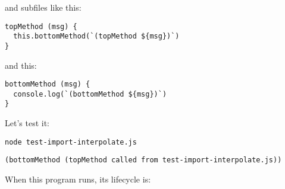 \documentclass[krantzl]{krantz}
\begin{document}
\noindent and subfiles like this:


\begin{lstlisting}[frame=tblr]
topMethod (msg) {
  this.bottomMethod(`(topMethod ${msg})`)
}
\end{lstlisting}



\noindent and this:


\begin{lstlisting}[frame=tblr]
bottomMethod (msg) {
  console.log(`(bottomMethod ${msg})`)
}
\end{lstlisting}



Let’s test it:


\begin{lstlisting}[frame=shadowbox]
node test-import-interpolate.js
\end{lstlisting}



\begin{lstlisting}[frame=tblr,backgroundcolor=\color{black!5}]
(bottomMethod (topMethod called from test-import-interpolate.js))
\end{lstlisting}



When this program runs, its lifecycle is:
\end{document}

